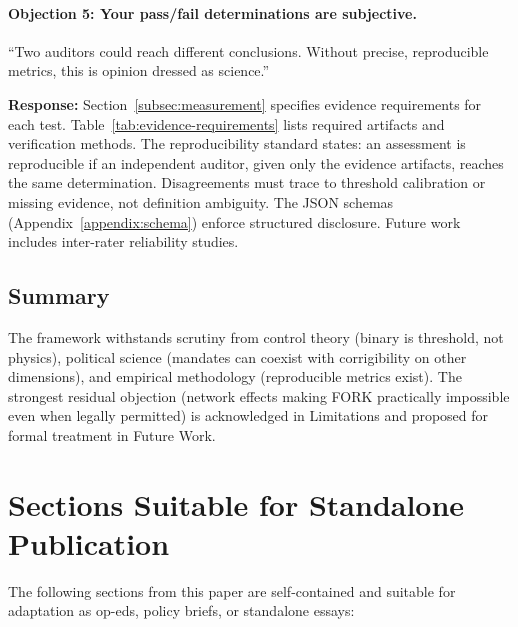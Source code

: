 \documentclass{article}
\begin{document}
\paragraph{Objection 5: Your pass/fail determinations are subjective.}
``Two auditors could reach different conclusions. Without precise, reproducible metrics, this is opinion dressed as science.''

\textbf{Response:} Section~\ref{subsec:measurement} specifies evidence requirements for each test. Table~\ref{tab:evidence-requirements} lists required artifacts and verification methods. The reproducibility standard states: an assessment is reproducible if an independent auditor, given only the evidence artifacts, reaches the same determination. Disagreements must trace to threshold calibration or missing evidence, not definition ambiguity. The JSON schemas (Appendix~\ref{appendix:schema}) enforce structured disclosure. Future work includes inter-rater reliability studies.

\subsection{Summary}

The framework withstands scrutiny from control theory (binary is threshold, not physics), political science (mandates can coexist with corrigibility on other dimensions), and empirical methodology (reproducible metrics exist). The strongest residual objection (network effects making FORK practically impossible even when legally permitted) is acknowledged in Limitations and proposed for formal treatment in Future Work.

\section{Sections Suitable for Standalone Publication}
\label{appendix:opeds}

The following sections from this paper are self-contained and suitable for adaptation as op-eds, policy briefs, or standalone essays:
\end{document}

